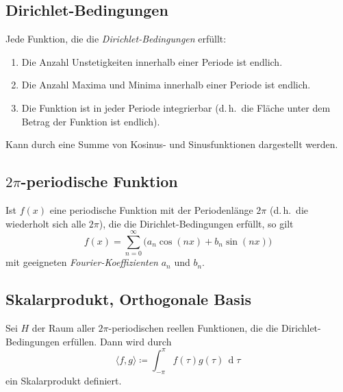 \documentclass[a4paper, 11pt, accentcolor = tud3b]{tudreport}
\DeclareMathOperator{\total}{d}
\newcommand{\dif}[1]{\,\total#1}
\renewcommand{\dh}{d.\,h.~}
\begin{document}
			\subsection{Dirichlet-Bedingungen}
				Jede Funktion, die die \emph{Dirichlet-Bedingungen} erfüllt:
				\begin{enumerate}
					\item Die Anzahl Unstetigkeiten innerhalb einer Periode ist endlich.
					\item Die Anzahl Maxima und Minima innerhalb einer Periode ist endlich.
					\item Die Funktion ist in jeder Periode integrierbar (\dh die Fläche unter dem Betrag der Funktion ist endlich).
				\end{enumerate}
				Kann durch eine Summe von Kosinus- und Sinusfunktionen dargestellt werden.

			\subsection{\(2\pi\)-periodische Funktion}
				Ist \( f(x) \) eine periodische Funktion mit der Periodenlänge \( 2\pi \) (\dh die wiederholt sich alle \(2\pi\)), die die Dirichlet-Bedingungen erfüllt, so gilt
				\begin{equation*}
					f(x) = \sum_{n = 0}^{\infty} \big( a_n \cos(nx) + b_n \sin(nx) \big)
				\end{equation*}
				mit geeigneten \emph{Fourier-Koeffizienten} \( a_n \) und \( b_n \).

			\subsection{Skalarprodukt, Orthogonale Basis}
				Sei \(H\) der Raum aller \(2\pi\)-periodischen reellen Funktionen, die die Dirichlet-Bedingungen erfüllen. Dann wird durch
				\begin{equation*}
					\langle f, g \rangle \coloneqq \int_{-\pi}^{\pi} \! f(\tau) g(\tau) \dif{\tau}
				\end{equation*}
				ein Skalarprodukt definiert.
				
\end{document}
